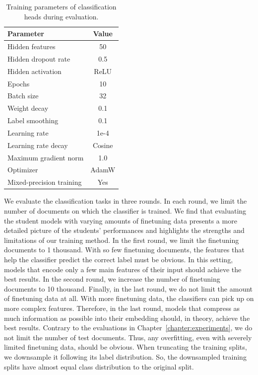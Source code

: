 \begin{table}
  \footnotesize
  \centering

  \begin{tabular}{l c}
    \toprule
    Parameter & Value \\
    \midrule
    Hidden features & 50 \\
    Hidden dropout rate & 0.5 \\
    Hidden activation & ReLU \\
    Epochs & 10 \\
    Batch size & 32 \\
    Weight decay & 0.1 \\
    Label smoothing & 0.1 \\
    Learning rate & 1e-4 \\
    Learning rate decay & Cosine \\
    Maximum gradient norm & 1.0 \\
    Optimizer & AdamW \\
    Mixed-precision training & Yes \\
    \bottomrule
  \end{tabular}

  \caption{Training parameters of classification heads during evaluation.}

  \label{table:head_train_eval_params}

\end{table}

We evaluate the classification tasks in three rounds. In each round, we limit
the number of documents on which the classifier is trained. We find that
evaluating the student models with varying amounts of finetuning data presents
a more detailed picture of the students' performances and highlights the
strengths and limitations of our training method. In the first round, we limit
the finetuning documents to 1 thousand. With so few finetuning documents, the
features that help the classifier predict the correct label must be obvious. In
this setting, models that encode only a few main features of their input should
achieve the best results. In the second round, we increase the number of
finetuning documents to 10 thousand. Finally, in the last round, we do not
limit the amount of finetuning data at all. With more finetuning data, the classifiers
can pick up on more complex features. Therefore, in the last round, models that
compress as much information as possible into their embedding should, in
theory, achieve the best results. Contrary to the evaluations in
Chapter~\ref{chapter:experiments}, we do not limit the number of test
documents. Thus, any overfitting, even with severely limited finetuning data, should be obvious. When truncating the training splits, we downsample it following its label distribution. So, the
downsampled training splits have almost equal class distribution to the
original split.

